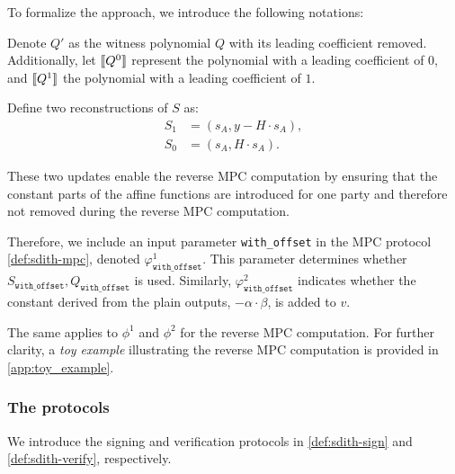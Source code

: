 \documentclass[11pt]{report}
\theoremstyle{definition}
\theoremstyle{plain}
\begin{document}
To formalize the approach, we introduce the following notations:

Denote $Q'$ as the witness polynomial $Q$ with its leading coefficient removed. Additionally, let $\llbracket Q^0 \rrbracket$ represent the polynomial with a leading coefficient of $0$, and $\llbracket Q^1 \rrbracket$ the polynomial with a leading coefficient of $1$.

Define two reconstructions of $S$ as:
\begin{align*}
  S_1 & = (s_A, y - H \cdot s_A), \\
  S_0 & = (s_A, H \cdot s_A).
\end{align*}

These two updates enable the reverse MPC computation by ensuring that the constant parts of the affine functions are introduced for one party and therefore not removed during the reverse MPC computation.

Therefore, we include an input parameter \texttt{with\_offset} in the MPC protocol \autoref{def:sdith-mpc}, denoted $\varphi^1_{\texttt{with\_offset}}$. This parameter determines whether $S_{\texttt{with\_offset}}, Q_{\texttt{with\_offset}}$ is used. Similarly, $\varphi^2_{\texttt{with\_offset}}$ indicates whether the constant derived from the plain outputs, $-\alpha \cdot \beta$, is added to $v$.

The same applies to $\phi^1$ and $\phi^2$ for the reverse MPC computation. For further clarity, a \textit{toy example} illustrating the reverse MPC computation is provided in \autoref{app:toy_example}.

\subsubsection{The protocols}
We introduce the signing and verification protocols in \autoref{def:sdith-sign} and \autoref{def:sdith-verify}, respectively.
\end{document}
